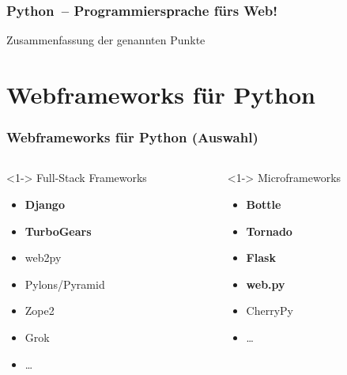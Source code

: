 \documentclass[
    t,
    smaller,
    compress,
    xcolor=svgnames,            %
    table,
]{beamer}
\begin{document}
\begin{frame}
  \frametitle{Python~-- Programmiersprache fürs Web!}

  Zusammenfassung der genannten Punkte


\end{frame}


\section{Webframeworks für Python}
\begin{frame}
  \frametitle{Webframeworks für Python (Auswahl)}

  \begin{columns}[T]
    \begin{column}[T]{.5\textwidth}<1->
        Full-Stack Frameworks
        \vspace{4pt}
        \begin{itemize}[<1->]
            \item \textbf{Django}
            \item \textbf{TurboGears}
            \item web2py
            \item Pylons/Pyramid
            \item Zope2
            \item Grok
            \item \dots
        \end{itemize}
    \end{column}
    \begin{column}[T]{.5\textwidth}<1->
        Microframeworks
        \begin{itemize}[<1->]
            \item \textbf{Bottle}
            \item \textbf{Tornado}
            \item \textbf{Flask}
            \item \textbf{web.py}
            \item CherryPy
            \item \dots
        \end{itemize}
    \end{column}
  \end{columns}

\end{frame}
\end{document}
